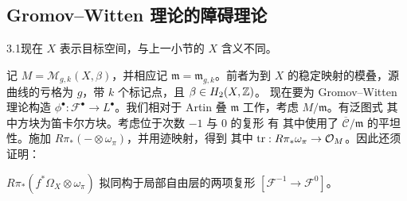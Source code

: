 \subsection{Gromov--Witten 理论的障碍理论}
\begin{Warning}{3.1}现在 $X$ 表示目标空间，与上一小节的 $X$ 含义不同。\end{Warning}
记 $M=\mathcal M_{g,k}(X,\beta)$，并相应记 $\mathfrak m=\mathfrak m_{g,k}$。前者为到 $X$ 的稳定映射的模叠，源曲线的亏格为 $g$，带 $k$ 个标记点，且 $\beta\in H_2(X,\mathbb Z)$。
现在要为 Gromov--Witten 理论构造 $\phi^\bullet:\mathcal F^\bullet\to L^\bullet$。我们相对于 Artin 叠 $\mathfrak m$ 工作，考虑 $M/\mathfrak m$。有泛图式
其中方块为笛卡尔方块。考虑位于次数 $-1$ 与 $0$ 的复形
有
其中使用了 $\overline{\mathcal C}/\mathfrak m$ 的平坦性。施加 $R\pi_*(-\otimes\omega_\pi)$，并用迹映射，得到
其中 $\operatorname{tr}:R\pi_*\omega_\pi\to\mathcal O_M$。因此还须证明：
\begin{lemma}\label{lem:3.11}
$R\pi_*(f^*\Omega_X\otimes\omega_\pi)$ 拟同构于局部自由层的两项复形 $[\mathcal F^{-1}\to \mathcal F^0]$。
\end{lemma}
